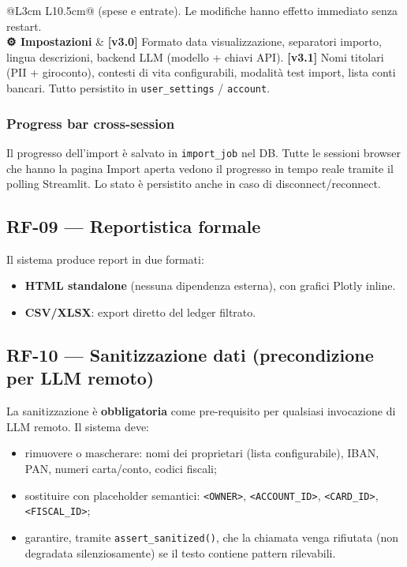 \documentclass[11pt, a4paper]{article}
\begin{document}
\begin{center}
\begin{longtable}{@{}L{3cm} L{10.5cm}@{}}
                             (spese e entrate). Le modifiche hanno effetto immediato
                             senza restart. \\[4pt]
\textbf{⚙️ Impostazioni} & \textbf{[v3.0]} Formato data visualizzazione, separatori
                             importo, lingua descrizioni, backend LLM (modello + chiavi
                             API). \textbf{[v3.1]} Nomi titolari (PII + giroconto),
                             contesti di vita configurabili, modalità test import,
                             lista conti bancari. Tutto persistito in
                             \texttt{user\_settings} / \texttt{account}. \\
\bottomrule
\end{longtable}
\end{center}

\subsubsection{Progress bar cross-session}

Il progresso dell'import è salvato in \texttt{import\_job} nel DB. Tutte le sessioni
browser che hanno la pagina Import aperta vedono il progresso in tempo reale tramite
il polling Streamlit. Lo stato è persistito anche in caso di disconnect/reconnect.

\subsection{RF-09 --- Reportistica formale}

Il sistema produce report in due formati:

\begin{itemize}[leftmargin=2em]
  \item \textbf{HTML standalone} (nessuna dipendenza esterna), con grafici Plotly inline.
  \item \textbf{CSV/XLSX}: export diretto del ledger filtrato.
\end{itemize}

\subsection{RF-10 --- Sanitizzazione dati (precondizione per LLM remoto)}

La sanitizzazione è \textbf{obbligatoria} come pre-requisito per qualsiasi invocazione
di LLM remoto. Il sistema deve:

\begin{itemize}[leftmargin=2em]
  \item rimuovere o mascherare: nomi dei proprietari (lista configurabile), IBAN, PAN,
        numeri carta/conto, codici fiscali;
  \item sostituire con placeholder semantici: \texttt{<OWNER>}, \texttt{<ACCOUNT\_ID>},
        \texttt{<CARD\_ID>}, \texttt{<FISCAL\_ID>};
  \item garantire, tramite \texttt{assert\_sanitized()}, che la chiamata venga rifiutata
        (non degradata silenziosamente) se il testo contiene pattern rilevabili.
\end{itemize}
\end{document}
